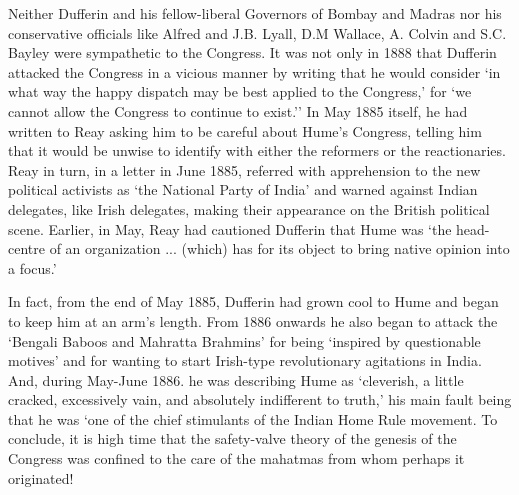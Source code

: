 Neither Dufferin and his fellow-liberal Governors of Bombay and Madras nor his conservative officials like Alfred and J.B. Lyall, D.M Wallace, A. Colvin and S.C. Bayley were sympathetic to the Congress. It was not only in 1888 that Dufferin attacked the Congress in a vicious manner by writing that he would consider `in what way the happy dispatch may be best applied to the Congress,' for `we cannot allow the Congress to continue to exist.'' In May 1885 itself, he had written to Reay asking him to be careful about Hume's Congress, telling him that it would be unwise to identify with either the reformers or the reactionaries. Reay in turn, in a letter in June 1885, referred with apprehension to the new political activists as `the National Party of India' and warned against Indian delegates, like Irish delegates, making their appearance on the British political scene. Earlier, in May, Reay had cautioned Dufferin that Hume was `the head-centre of an organization ... (which) has for its object to bring native opinion into a focus.'

In fact, from the end of May 1885, Dufferin had grown cool to Hume and began to keep him at an arm's length. From 1886 onwards he also began to attack the `Bengali Baboos and Mahratta Brahmins' for being `inspired by questionable motives' and for wanting to start Irish-type revolutionary agitations in India. And, during May-June 1886. he was describing Hume as `cleverish, a little cracked, excessively vain, and absolutely indifferent to truth,' his main fault being that he was `one of the chief stimulants of the Indian Home Rule movement. To conclude, it is high time that the safety-valve theory of the genesis of the Congress was confined to the care of the mahatmas from whom perhaps it originated!
